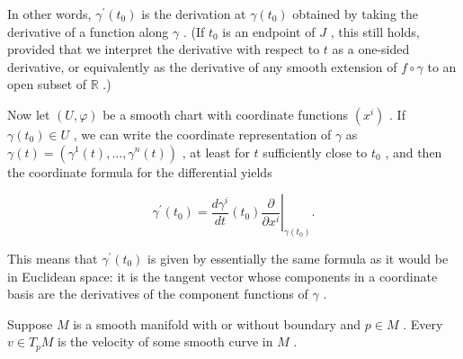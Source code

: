 \begin{definition}
In other words, ${\gamma }^{\prime }\left( {t}_{0}\right)$ is the derivation at $\gamma \left( {t}_{0}\right)$ obtained by taking the derivative of a function along $\gamma$ . (If ${t}_{0}$ is an endpoint of $J$ , this still holds, provided that we interpret the derivative with respect to $t$ as a one-sided derivative, or equivalently as the derivative of any smooth extension of $f \circ  \gamma$ to an open subset of $\mathbb{R}$ .)

Now let $\left( {U,\varphi }\right)$ be a smooth chart with coordinate functions $\left( {x}^{i}\right)$ . If $\gamma \left( {t}_{0}\right)  \in  U$ , we can write the coordinate representation of $\gamma$ as $\gamma \left( t\right)  = \left( {{\gamma }^{1}\left( t\right) ,\ldots ,{\gamma }^{n}\left( t\right) }\right)$ , at least for $t$ sufficiently close to ${t}_{0}$ , and then the coordinate formula for the differential yields

\[
{\gamma }^{\prime }\left( {t}_{0}\right)  = {\left. \frac{d{\gamma }^{i}}{dt}\left( {t}_{0}\right) \frac{\partial }{\partial {x}^{i}}\right| }_{\gamma \left( {t}_{0}\right) }.
\]

This means that ${\gamma }^{\prime }\left( {t}_{0}\right)$ is given by essentially the same formula as it would be in Euclidean space: it is the tangent vector whose components in a coordinate basis are the derivatives of the component functions of $\gamma$ .
\end{definition}

\begin{proposition}
\label{prop:3-23}
\leanok
{}
Suppose $M$ is a smooth manifold with or without boundary and $p \in  M$ . Every $v \in  {T}_{p}M$ is the velocity of some smooth curve in $M$ .
\end{proposition}


